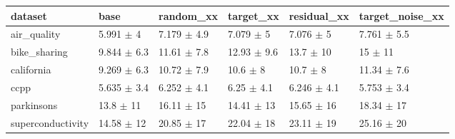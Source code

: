 \begin{tabular}{llllll}
\toprule
dataset & base & random\_xx & target\_xx & residual\_xx & target\_noise\_xx \\
\midrule
air\_quality & 5.991 $\pm$ 4 & 7.179 $\pm$ 4.9 & 7.079 $\pm$ 5 & 7.076 $\pm$ 5 & 7.761 $\pm$ 5.5 \\
bike\_sharing & 9.844 $\pm$ 6.3 & 11.61 $\pm$ 7.8 & 12.93 $\pm$ 9.6 & 13.7 $\pm$ 10 & 15 $\pm$ 11 \\
california & 9.269 $\pm$ 6.3 & 10.72 $\pm$ 7.9 & 10.6 $\pm$ 8 & 10.7 $\pm$ 8 & 11.34 $\pm$ 7.6 \\
ccpp & 5.635 $\pm$ 3.4 & 6.252 $\pm$ 4.1 & 6.25 $\pm$ 4.1 & 6.246 $\pm$ 4.1 & 5.753 $\pm$ 3.4 \\
parkinsons & 13.8 $\pm$ 11 & 16.11 $\pm$ 15 & 14.41 $\pm$ 13 & 15.65 $\pm$ 16 & 18.34 $\pm$ 17 \\
superconductivity & 14.58 $\pm$ 12 & 20.85 $\pm$ 17 & 22.04 $\pm$ 18 & 23.11 $\pm$ 19 & 25.16 $\pm$ 20 \\
\bottomrule
\end{tabular}
